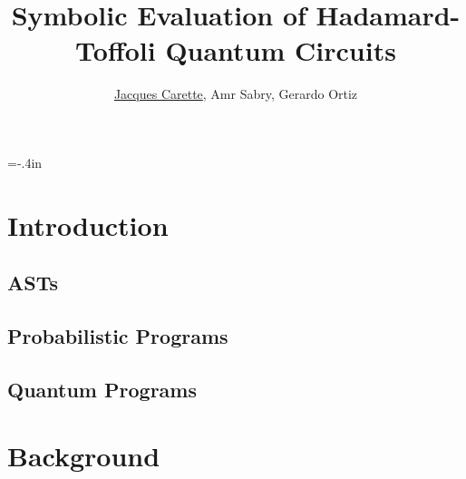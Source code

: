 \documentclass{beamer}
\title[\pgfuseimage{logo}] %
{Symbolic Evaluation of Hadamard-Toffoli Quantum Circuits}
\author[]{\underline{Jacques Carette}, Amr Sabry, Gerardo Ortiz}
\begin{document}
%

\hoffset=-.4in %
\begin{frame}[plain]

\titlepage

\end{frame}
\hoffset=0in %


\section[Introduction]{Introduction}

\subsection[ASTs]{ASTs}
\subsection[Probabilistic]{Probabilistic Programs}
\subsection[Quantum]{Quantum Programs}


\section[Background]{Background}
\end{document}
